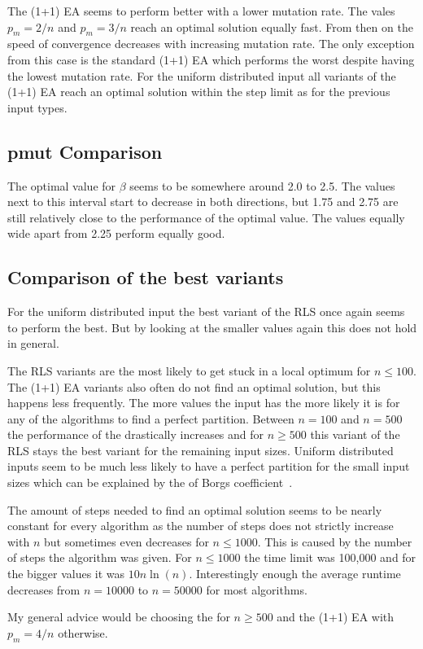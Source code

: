

The (1+1) EA seems to perform better with a lower mutation rate.
The vales $p_m=2/n$ and $p_m=3/n$ reach an optimal solution equally fast.
From then on the speed of convergence decreases with increasing mutation rate.
The only exception from this case is the standard (1+1) EA which performs the worst despite having the lowest mutation rate.
For the uniform distributed input all variants of the (1+1) EA reach an optimal solution within the step limit as for the previous input types.
\subsection{pmut Comparison}




The optimal value for $\beta$ seems to be somewhere around 2.0 to 2.5.
The values next to this interval start to decrease in both directions, but 1.75 and 2.75 are still relatively close to the performance of the optimal value.
The values equally wide apart from 2.25 perform equally good.

\subsection{Comparison of the best variants}




For the uniform distributed input the best variant of the RLS once again seems to perform the best.
But by looking at the smaller values again this does not hold in general.



The RLS variants are the most likely to get stuck in a local optimum for $n\le100$.
The (1+1) EA variants also often do not find an optimal solution, but this happens less frequently.
The more values the input has the more likely it is for any of the algorithms to find a perfect partition.
Between $n=100$ and $n=500$ the performance of the \RLSN[2] drastically increases and for $n\ge500$ this variant of the RLS stays the best variant for the remaining input sizes.
Uniform distributed inputs seem to be much less likely to have a perfect partition for the small input sizes which can be explained by the of Borgs \etal coefficient~\cite{borgs2001phase}.



The amount of steps needed to find an optimal solution seems to be nearly constant for every algorithm as the number of steps does not strictly increase with $n$ but sometimes even decreases for $n\le1000$.
This is caused by the number of steps the algorithm was given.
For $n\le1000$ the time limit was 100,000 and for the bigger values it was $10n\ln(n)$.
Interestingly enough the average runtime decreases from $n=10000$ to $n=50000$ for most algorithms.



My general advice would be choosing the \RLSN[2] for $n\ge500$ and the (1+1) EA with $p_m=4/n$ otherwise.

